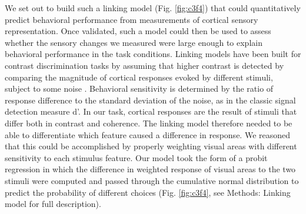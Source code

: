 We set out to build such a linking model (Fig. \ref{fig:c3f4}) that could quantitatively predict behavioral performance from measurements of cortical sensory representation. Once validated, such a model could then be used to assess whether the sensory changes we measured were large enough to explain behavioral performance in the task conditions. Linking models have been built for contrast discrimination tasks by assuming that higher contrast is detected by comparing the magnitude of cortical responses evoked by different stimuli, subject to some noise \citep{Boynton1999-jd,Foley1981-aw,Gardner2015-bd,Ling2006-zx,Nachmias1974-vz,Pestilli2009-xu}. Behavioral sensitivity is determined by the ratio of response difference to the standard deviation of the noise, as in the classic signal detection measure d’. In our task, cortical responses are the result of stimuli that differ both in contrast and coherence. The linking model therefore needed to be able to differentiate which feature caused a difference in response. We reasoned that this could be accomplished by properly weighting visual areas with different sensitivity to each stimulus feature. Our model took the form of a probit regression \citep{Bliss1934-em} in which the difference in weighted response of visual areas to the two stimuli were computed and passed through the cumulative normal distribution to predict the probability of different choices (Fig. \ref{fig:c3f4}, see Methods: Linking model for full description).


